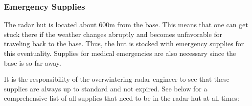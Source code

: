 \subsubsection{Emergency Supplies}
The radar hut is located about 600m from the base. This means that one can get stuck there if the weather changes abruptly and becomes unfavorable for traveling back to the base. Thus, the hut is stocked with emergency supplies for this eventuality. Supplies for medical emergencies are also necessary since the base is so far away.
\par
It is the responsibility of the overwintering radar engineer to see that these supplies are always up to standard and not expired. See  below for a comprehensive list of all supplies that need to be in the radar hut at all times:
\par

